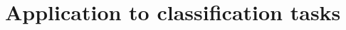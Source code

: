 \documentclass[preprint,12pt]{elsarticle}
\begin{document}




\section{Application to classification tasks}


\end{document}
